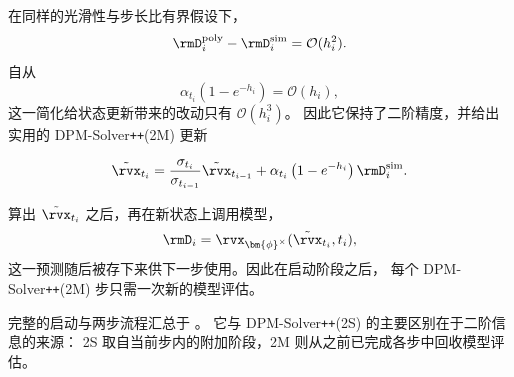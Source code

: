 在同样的光滑性与步长比有界假设下，
\[
\rmD_i^{\mathrm{poly}}
-
\rmD_i^{\mathrm{sim}}
=
\mathcal O(h_i^2).
\]
自从
\[
\alpha_{t_i}
\left(
1-e^{-h_i}
\right)
=
\mathcal O(h_i),
\]
这一简化给状态更新带来的改动只有 $\mathcal O(h_i^3)$。
因此它保持了二阶精度，并给出实用的
DPM-Solver\texttt{++}(2M) 更新
\begin{mdframed}
\[
\tilde\rvx_{t_i}
=
\frac{\sigma_{t_i}}{\sigma_{t_{i-1}}}
\tilde\rvx_{t_{i-1}}
+
\alpha_{t_i}
\left(
1-e^{-h_i}
\right)
\rmD_i^{\mathrm{sim}}.
\]
\end{mdframed}

算出 $\tilde\rvx_{t_i}$ 之后，再在新状态上调用模型，
\[
\rmD_i
=
\rvx_{\bm{\phi}^\times}
(\tilde\rvx_{t_i},t_i),
\]
这一预测随后被存下来供下一步使用。因此在启动阶段之后，
每个 DPM-Solver\texttt{++}(2M) 步只需一次新的模型评估。


完整的启动与两步流程汇总于 。
它与 DPM-Solver\texttt{++}(2S) 的主要区别在于二阶信息的来源：
2S 取自当前步内的附加阶段，2M 则从之前已完成各步中回收模型评估。


